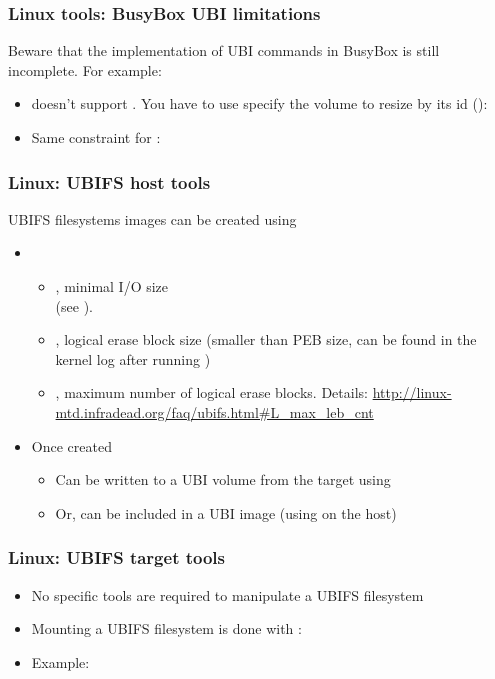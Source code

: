 \begin{frame}
  \frametitle{Linux tools: BusyBox UBI limitations}
  Beware that the implementation of UBI commands in BusyBox is still
  incomplete. For example:
  \begin{itemize}
    \item {} doesn't support . You have
      to use specify the volume to resize by its id ():\\
    \item Same constraint for :\\
    \end{itemize}
\end{frame} 

\begin{frame}
  \frametitle{Linux: UBIFS host tools}
  UBIFS filesystems images can be created using 
    \begin{itemize}
    \item {}
      \begin{itemize}
      \item {}, minimal I/O size\\
                 (see ).
      \item {}, logical erase block size (smaller than
                 PEB size, can be found in the kernel log after running
 		 )
      \item {}, maximum number of logical erase
        blocks. Details:
        {\scriptsize\url{http://linux-mtd.infradead.org/faq/ubifs.html\#L_max_leb_cnt}}
      \end{itemize}
    \item Once created
      \begin{itemize}
      \item Can be written to a UBI volume from the target using
      \item Or, can be included in a UBI image (using 
        on the host)
      \end{itemize}
    \end{itemize}
\end{frame}

\begin{frame}
  \frametitle{Linux: UBIFS target tools}
  \begin{itemize}
  \item No specific tools are required to manipulate a UBIFS filesystem
  \item Mounting a UBIFS filesystem is done with :\\
  \item Example:\\
  \end{itemize}
\end{frame}

